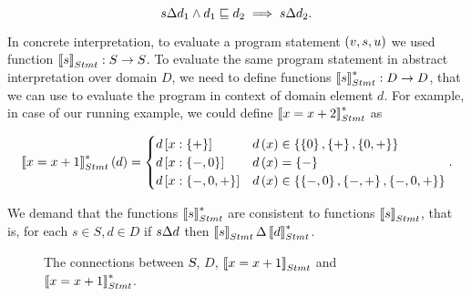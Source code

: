 \documentclass[..thesis.tex]{subfiles}
\begin{document}
\begin{equation*}
s \Delta d_1 \land d_1 \sqsubseteq d_2 \implies s \Delta d_2 \text{.}
\end{equation*}

In concrete interpretation, to evaluate a program statement $\left( v, s, u \right)$ we used function $\left\llbracket s \right\rrbracket_{Stmt} : S \to S$. To evaluate the same program statement in abstract interpretation over domain $D$, we need to define functions $\left\llbracket s \right\rrbracket_{Stmt}^{*} : D \to D$, that we can use to evaluate the program in context of domain element $d$. For example, in case of our running example, we could define $\left\llbracket x =  x + 2 \right\rrbracket_{Stmt}^{*}$ as

\begin{equation*}
\left\llbracket x = x + 1 \right\rrbracket_{Stmt}^{*} \left( d \right) =
\begin{cases}
d \left[ x : \left\lbrace + \right\rbrace \right] & d \left( x \right)  \in \left\lbrace  \left\lbrace 0  \right\rbrace, \left\lbrace + \right\rbrace, \left\lbrace 0, + \right\rbrace \right\rbrace  \\
d \left[ x : \left\lbrace -, 0 \right\rbrace \right] & d \left( x \right) =  \left\lbrace - \right\rbrace \\
d \left[ x : \left\lbrace -, 0, + \right\rbrace \right] & d \left( x \right) \in \left\lbrace \left\lbrace -,0 \right\rbrace, \left\lbrace -, + \right\rbrace, \left\lbrace -, 0, + \right\rbrace \right\rbrace \\
\end{cases}
\text{.}      
\end{equation*}

We demand that the functions $\left\llbracket s \right\rrbracket_{Stmt}^{*}$ are consistent to functions $\left\llbracket s \right\rrbracket_{Stmt}$, that is, for each $s \in S, d \in D$ if $s \Delta d$ then $ \left\llbracket s \right\rrbracket_{Stmt} \Delta \left\llbracket d \right\rrbracket_{Stmt}^{*}$.

\begin{figure}[H]
  \begin{centering}
  \end{centering}
  \caption{The connections between $\textsl{S}$, $D$, $\left\llbracket x = x +1  \right\rrbracket_{Stmt}$ and $\left\llbracket x = x + 1 \right\rrbracket_{Stmt}^{*}$.}
\end{figure}
\end{document}
